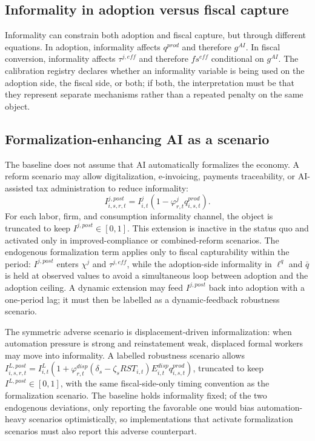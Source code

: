 \documentclass[11pt,a4paper]{article}
\begin{document}
\subsection{Informality in adoption versus fiscal capture}

Informality can constrain both adoption and fiscal capture, but through different equations. In adoption, informality affects $q^{prod}$ and therefore $g^{AI}$. In fiscal conversion, informality affects $\tau^{j,eff}$ and therefore $fs^{eff}$ conditional on $g^{AI}$. The calibration registry declares whether an informality variable is being used on the adoption side, the fiscal side, or both; if both, the interpretation must be that they represent separate mechanisms rather than a repeated penalty on the same object.

\subsection{Formalization-enhancing AI as a scenario}

The baseline does not assume that AI automatically formalizes the economy. A reform scenario may allow digitalization, e-invoicing, payments traceability, or AI-assisted tax administration to reduce informality:
\begin{equation}
    I^{j,post}_{i,s,r,t}=I^j_{i,t}\left(1-\varphi^j_{r,t}q^{prod}_{i,s,t}\right).
\end{equation}
For each labor, firm, and consumption informality channel, the object is truncated to keep $I^{j,post}\in[0,1]$. This extension is inactive in the status quo and activated only in improved-compliance or combined-reform scenarios.
The endogenous formalization term applies only to fiscal capturability within the period: $I^{j,post}$ enters $\chi^j$ and $\tau^{j,eff}$, while the adoption-side informality in $\ell^q$ and $\bar q$ is held at observed values to avoid a simultaneous loop between adoption and the adoption ceiling. A dynamic extension may feed $I^{j,post}$ back into adoption with a one-period lag; it must then be labelled as a dynamic-feedback robustness scenario.

The symmetric adverse scenario is displacement-driven informalization: when automation pressure is strong and reinstatement weak, displaced formal workers may move into informality. A labelled robustness scenario allows $I^{L,post}_{i,s,r,t}=I^L_{i,t}\left(1+\varphi^{disp}_{r,t}(\delta_s-\zeta_s RST_{i,t})E^{disp}_{i,t}q^{prod}_{i,s,t}\right)$, truncated to keep $I^{L,post}\in[0,1]$, with the same fiscal-side-only timing convention as the formalization scenario. The baseline holds informality fixed; of the two endogenous deviations, only reporting the favorable one would bias automation-heavy scenarios optimistically, so implementations that activate formalization scenarios must also report this adverse counterpart.
\end{document}
